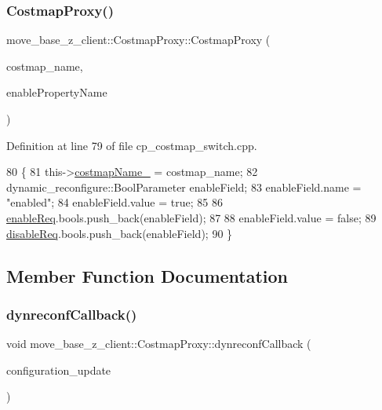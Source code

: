 \subsubsection{\texorpdfstring{Costmap\+Proxy()}{CostmapProxy()}}
{\footnotesize\ttfamily move\+\_\+base\+\_\+z\+\_\+client\+::\+Costmap\+Proxy\+::\+Costmap\+Proxy (\begin{DoxyParamCaption}\item[{std\+::string}]{costmap\+\_\+name,  }\item[{std\+::string}]{enable\+Property\+Name }\end{DoxyParamCaption})}



Definition at line 79 of file cp\+\_\+costmap\+\_\+switch.\+cpp.


\begin{DoxyCode}
80 \{
81     this->\hyperlink{classmove__base__z__client_1_1CostmapProxy_a842fd8c5d276df96e20be8fdbda5c4aa}{costmapName\_} = costmap\_name;
82     dynamic\_reconfigure::BoolParameter enableField;
83     enableField.name = \textcolor{stringliteral}{"enabled"};
84     enableField.value = \textcolor{keyword}{true};
85 
86     \hyperlink{classmove__base__z__client_1_1CostmapProxy_a8839c249af6a53a7dc8f2672966cbbae}{enableReq}.bools.push\_back(enableField);
87 
88     enableField.value = \textcolor{keyword}{false};
89     \hyperlink{classmove__base__z__client_1_1CostmapProxy_a3b7933e704ce9bab4061d6902d0e961a}{disableReq}.bools.push\_back(enableField);
90 \}
\end{DoxyCode}


\subsection{Member Function Documentation}
\mbox{\label{classmove__base__z__client_1_1CostmapProxy_ad8d20cbef6527b9ef3a21c866b1c08e6}} 
\subsubsection{\texorpdfstring{dynreconf\+Callback()}{dynreconfCallback()}}
{\footnotesize\ttfamily void move\+\_\+base\+\_\+z\+\_\+client\+::\+Costmap\+Proxy\+::dynreconf\+Callback (\begin{DoxyParamCaption}\item[{const dynamic\+\_\+reconfigure\+::\+Config\+::\+Const\+Ptr \&}]{configuration\+\_\+update }\end{DoxyParamCaption})\hspace{0.3cm}{\ttfamily [private]}}



